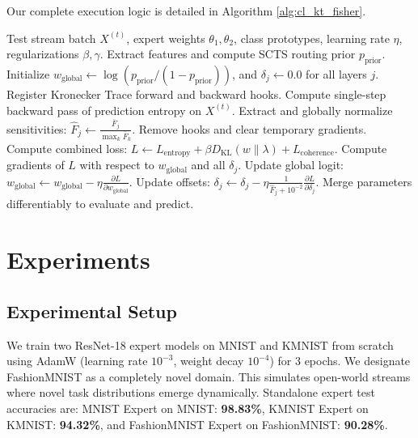 \documentclass{article}
\theoremstyle{plain}
\theoremstyle{definition}
\theoremstyle{remark}
\begin{document}
Our complete execution logic is detailed in Algorithm \ref{alg:cl_kt_fisher}.

\begin{algorithm}[tb]
\caption{CL-KT-Fisher Adaptation Loop}
\label{alg:cl_kt_fisher}
\begin{algorithmic}[1]
    Test stream batch $X^{(t)}$, expert weights $\theta_1, \theta_2$, class prototypes, learning rate $\eta$, regularizations $\beta, \gamma$.
   \STATE Extract features and compute SCTS routing prior $p_{\text{prior}}$.
   \STATE Initialize $w_{\text{global}} \leftarrow \log(p_{\text{prior}} / (1 - p_{\text{prior}}))$, and $\delta_j \leftarrow 0.0$ for all layers $j$.
   \STATE Register Kronecker Trace forward and backward hooks.
   \STATE Compute single-step backward pass of prediction entropy on $X^{(t)}$.
   \STATE Extract and globally normalize sensitivities: $\hat{F}_j \leftarrow \frac{\bar{F}_j}{\max_k \bar{F}_k}$.
   \STATE Remove hooks and clear temporary gradients.
   \STATE Compute combined loss: $L \leftarrow L_{\text{entropy}} + \beta D_{\text{KL}}(w \| \lambda) + L_{\text{coherence}}$.
   \STATE Compute gradients of $L$ with respect to $w_{\text{global}}$ and all $\delta_j$.
   \STATE Update global logit: $w_{\text{global}} \leftarrow w_{\text{global}} - \eta \frac{\partial L}{\partial w_{\text{global}}}$.
   \STATE Update offsets: $\delta_j \leftarrow \delta_j - \eta \frac{1}{\hat{F}_j + 10^{-2}} \frac{\partial L}{\partial \delta_j}$.
   \STATE Merge parameters differentiably to evaluate and predict.
\end{algorithmic}
\end{algorithm}

\section{Experiments}
\label{sec:experiments}

\subsection{Experimental Setup}
We train two ResNet-18 expert models on MNIST and KMNIST from scratch using AdamW (learning rate $10^{-3}$, weight decay $10^{-4}$) for 3 epochs. We designate FashionMNIST as a completely novel domain. This simulates open-world streams where novel task distributions emerge dynamically. Standalone expert test accuracies are: MNIST Expert on MNIST: \textbf{98.83\%}, KMNIST Expert on KMNIST: \textbf{94.32\%}, and FashionMNIST Expert on FashionMNIST: \textbf{90.28\%}.
\end{document}
